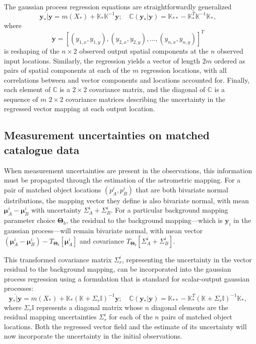 \documentclass[manuscript]{aastex}
\newcommand{\bsmu}{\boldsymbol\mu}
\newcommand{\bsT}{\boldsymbol\Theta}
\begin{document}
The gaussian process regression equations are straightforwardly generalized
\begin{equation}
 \overline{\mathbf{y}_\ast | \mathbf{y}} = m(X_\ast) + \mathbb{K}_\ast \mathbb{K}^{-1} \mathbf{y}; \quad \mathbb{C}(\mathbf{y}_\ast | \mathbf{y}) = \mathbb{K}_{\ast\ast} - \mathbb{K}_\ast^T \mathbb{K}^{-1} \mathbb{K}_\ast,
\end{equation}
where
\begin{equation}
\mathbf{y} = \left[ (y_{1,x},y_{1,y}), (y_{2,x},y_{2,y}),\ldots,(y_{n,x},y_{n,y}) \right]^T
\end{equation}
is reshaping of the $n\times2$ observed output spatial components at the $n$ observed input locations. Similarly, the regression yields a vector of length $2m$ ordered as pairs of spatial components at each of the $m$ regression locations, with all correlations between and vector components and locations accounted for. Finally, each element of $\mathbb{C}$ is a $2\times2$ covariance matrix, and the diagonal of $\mathbb{C}$ is a sequence of $m$ $2\times2$ covariance matrices describing the uncertainty in the regressed vector mapping at each output location.



\subsection{Measurement uncertainties on matched catalogue data}
When measurement uncertainties are present in the observations, this information must be propagated through the estimation of the astrometric mapping. For a pair of matched object locations $(p_A^i, p_B^i)$ that are both bivariate normal distributions, the mapping vector they define is also bivariate normal, with mean $\bsmu_A^i - \bsmu_B^i$ with uncertainty $\Sigma_A^i+\Sigma_B^i$. For a particular background mapping parameter choice $\bsT_b$, the residual to the background mapping---which is $\mathbf{y}_i$ in the gaussian process---will remain bivariate normal, with mean vector $(\bsmu_A^i - \bsmu_B^i) - T_{\bsT_b}\left[\bsmu_A^i\right]$ and covariance $T_{\bsT_b}\left[\Sigma_A^i+\Sigma_B^i\right]$.

This transformed covariance matrix $\Sigma_r^i$, representing the uncertainty in the vector residual to the background mapping, can be incorporated into the gaussian process regression using a formulation that is standard for scalar-output gaussian processes:
\begin{equation}
 \overline{\mathbf{y}_\ast | \mathbf{y}} = m(X_\ast) + \mathbb{K}_\ast (\mathbb{K}+\Sigma_r\mathbb{I})^{-1} \mathbf{y}; \quad \mathbb{C}(\mathbf{y}_\ast | \mathbf{y}) = \mathbb{K}_{\ast\ast} - \mathbb{K}_\ast^T (\mathbb{K}+\Sigma_r\mathbb{I})^{-1} \mathbb{K}_\ast,
\end{equation}
where $\Sigma_r\mathbb{I}$ represents a diagonal matrix whose $n$ diagonal elements are the residual mapping uncertainties $\Sigma_r^i$ for each of the $n$ pairs of matched object locations. Both the regressed vector field and the estimate of its uncertainty will now incorporate the uncertainty in the initial observations.
\end{document}

